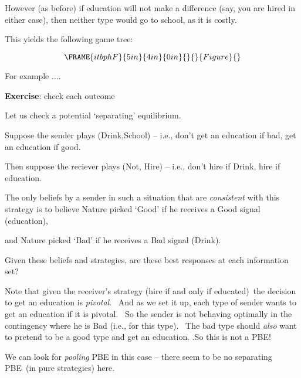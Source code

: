 \documentclass{article}
\begin{document}
However (as before) if education will not make a difference (say, you are
hired in either case), then neither type would go to school, as it is costly.

This yields the following game tree:

\begin{equation}
\FRAME{itbphF}{5in}{4in}{0in}{}{}{Figure}{\special{language "Scientific
Word";type "GRAPHIC";maintain-aspect-ratio TRUE;display "USEDEF";valid_file
"T";width 5in;height 4in;depth 0in;original-width 7.2834in;original-height
5.7086in;cropleft "0";croptop "1";cropright "1";cropbottom "0";tempfilename
'JSHANW38.wmf';tempfile-properties "XPR";}}
\end{equation}

For example ....

\bigskip

\textbf{Exercise}: check each outcome

\bigskip

Let us check a potential `separating' equilibrium.

Suppose the sender plays (Drink,School) -- i.e., don't get an education if
bad, get an education if good.

Then suppose the reciever plays (Not, Hire) -- i.e., don't hire if Drink,
hire if education.

\bigskip

The only beliefs by a sender in such a situation that are \textit{consistent}
with this strategy is to believe Nature picked `Good' if he receives a Good
signal (education),

and Nature picked `Bad' if he receives a Bad signal (Drink). \

\bigskip

Given these beliefs and strategies, are these best responses at each
information set?\bigskip

Note that given the receiver's strategy (hire if and only if educated)\ the
decision to get an education is \textit{pivotal}. \ And as we set it up,
each type of sender wants to get an education if it is pivotal. \ So the
sender is not behaving optimally in the contingency where he is Bad (i.e.,
for this type). \ The bad type should \textit{also} want to pretend to be a
good type and get an education. .So this is not a PBE!

\bigskip

We can look for \textit{pooling} PBE in this case -- there seem to be no
separating PBE\ (in pure strategies) here.
\end{document}
